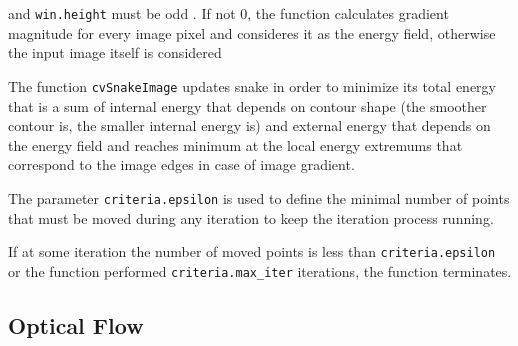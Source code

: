 \begin{description}
 and \texttt{win.height} must be odd
. If not 0, the function calculates gradient magnitude for every image pixel and consideres it as the energy field, otherwise the input image itself is considered
\end{description}

The function \texttt{cvSnakeImage} updates snake in order to minimize its
total energy that is a sum of internal energy that depends on contour
shape (the smoother contour is, the smaller internal energy is) and
external energy that depends on the energy field and reaches minimum at
the local energy extremums that correspond to the image edges in case
of image gradient.

The parameter \texttt{criteria.epsilon} is used to define the minimal
number of points that must be moved during any iteration to keep the
iteration process running.

If at some iteration the number of moved points is less
than \texttt{criteria.epsilon} or the function performed
\texttt{criteria.max\_iter} iterations, the function terminates.

\subsection{Optical Flow}

\label{CalcOpticalFlowHS}

